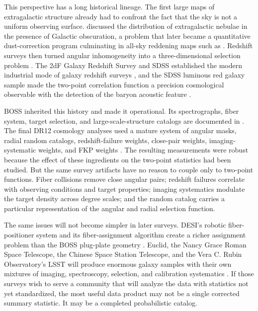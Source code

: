 \documentclass[apj]{emulateapj}
\begin{document}
This perspective has a long historical lineage.  The first large maps of
extragalactic structure already had to confront the fact that the sky is not a
uniform observing surface.  \citet{Hubble1934} discussed the distribution of
extragalactic nebulae in the presence of Galactic obscuration, a problem that
later became a quantitative dust-correction program culminating in all-sky
reddening maps such as \citet{SFD1998}.  Redshift surveys then turned angular
inhomogeneity into a three-dimensional selection problem
\citep{DavisPeebles1983,deLapparent1986}.  The 2dF Galaxy Redshift Survey and
SDSS established the modern industrial mode of galaxy redshift surveys
\citep{York2000,Colless2001,Cole2005}, and the SDSS luminous red galaxy sample
made the two-point correlation function a precision cosmological observable
with the detection of the baryon acoustic feature \citep{Eisenstein2005}.

BOSS inherited this history and made it operational.  Its spectrographs,
fiber system, target selection, and large-scale-structure catalogs are
documented in \citet{Dawson2013,Smee2013,Reid2016}.  The final DR12 cosmology
analyses used a mature system of angular masks, radial random catalogs,
redshift-failure weights, close-pair weights, imaging-systematic weights, and
FKP weights \citep{Alam2017,Ross2017}.  The resulting measurements were robust
because the effect of these ingredients on the two-point statistics had been
studied.  But the same survey artifacts have no reason to couple only to
two-point functions.  Fiber collisions remove close angular pairs; redshift
failures correlate with observing conditions and target properties; imaging
systematics modulate the target density across degree scales; and the random
catalog carries a particular representation of the angular and radial selection
function.

The same issues will not become simpler in later surveys.  DESI's robotic
fiber-positioner system and its fiber-assignment algorithm create a richer
assignment problem than the BOSS plug-plate geometry
\citep{Silber2023,Pinol2017,Lan2023,Lasker2025}.  Euclid, the Nancy Grace
Roman Space Telescope, the Chinese Space Station Telescope, and the Vera C.
Rubin Observatory's LSST will produce enormous galaxy samples with their own
mixtures of imaging, spectroscopy, selection, and calibration systematics
\citep{Euclid2025,Wang2022,Miao2023,CSST2026,ZhanTyson2018}.  If those surveys
wish to serve a community that will analyze the data with statistics not yet
standardized, the most useful data product may not be a single corrected
summary statistic.  It may be a completed probabilistic catalog.
\end{document}
